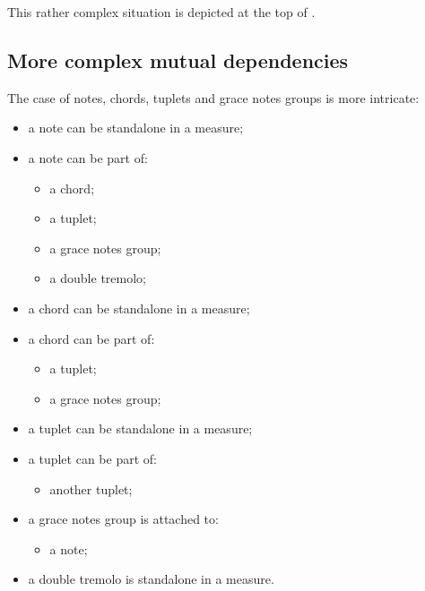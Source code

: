 This rather complex situation is depicted at the top of .


\subsection{More complex mutual dependencies}

The case of notes, chords, tuplets and grace notes groups is more intricate:
\begin{itemize}
\item a note can be standalone in a measure;
\item a note can be part of:
  \begin{itemize}
  \item a chord;
  \item a tuplet;
  \item a grace notes group;
  \item a double tremolo;
  \end{itemize}

\item a chord can be standalone in a measure;
\item a chord can be part of:
  \begin{itemize}
  \item a tuplet;
  \item a grace notes group;
  \end{itemize}

\item a tuplet can be standalone in a measure;
\item a tuplet can be part of:
  \begin{itemize}
  \item another tuplet;
  \end{itemize}

\item a grace notes group is attached to:
  \begin{itemize}
  \item a note;
  \end{itemize}

\item a double tremolo is standalone in a measure.
\end{itemize}

